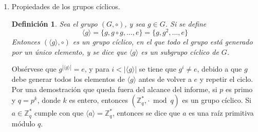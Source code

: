 \documentclass[hidelinks, 12pt]{article}
\newcommand{\Zs}{\mathbb{Z}^*}
\newtheorem*{definition}{Definición}
\begin{document}
\begin{enumerate}
\begin{proof}
        En primer lugar, obsérvese que 
        \[h=f(g)=f(g)\ast e_H=f(g)\ast f(e_i)=f(g\circ e_i),~i=1,\dots,n\]
        Entonces, $g\circ e_i\in f^{-1}(h)$, y como la igualdad planteada encima se cumple para todos los $e_i\in K$, entonces $g\circ e_1,\dots,g\circ e_n\in f^{-1}(h)$, y por lo tanto $g\circ K\subseteq f^{-1}(h)$.

        En segundo lugar, sea $g'\in f^{-1}(h)$. Entonces:
        \begin{align*}
            &g'=e_G\circ g'=(g\circ g^{-1})\circ g'=g\circ(g^{-1}\circ g')&&\big{/}f(~)\\
            f(&g')=f(g\circ(g^{-1}\circ g'))=f(g)\ast f(g^{-1}\circ g') \\
            &h=h\ast f(g^{-1}\circ g')&&\big{/}h^{-1}\ast \\
            &e_H=e_H\ast f(g^{-1}\circ g')=f(g^{-1}\circ g')
        \end{align*}
        Por lo que $g^{-1}\circ g'\in K$, y si se define $c=g^{-1}\circ g'$, se obtiene que $g'=g\circ c$ para un $c\in K$. Esto significa que $g'\in g\circ K$, lo que implica que $f^{-1}(h)\subseteq g\circ K$.

        Debido a que $f^{-1}(h)\subseteq g\circ K$ y $f^{-1}(h)\supseteq g\circ K$, se comprueba que $f^{-1}(h)=g\circ K$, y por lo tanto $|f^{-1}(h)|=|g\circ K|=|K|$. Entonces, se concluye que para todo par $h_1,h_2\in H$, se cumple que
        \[|f^{-1}(h_1)|=|K|=|f^{-1}(h_2)|\]
    \end{proof}

    \newpage
    \item Propiedades de los grupos cíclicos. \\
    \begin{definition}
        Sea el grupo $(G,\circ)$, y sea $g\in G$. Si se define
        \[\langle g\rangle=\{g,g\circ g,\dots,e\}=\{g,g^2,\dots,e\}\]
        Entonces $(\langle g\rangle,\circ)$ es un grupo cíclico, en el que todo el grupo está generado por un único elemento, y se dice que $\langle g\rangle$ es un subgrupo cíclico de $G$.
    \end{definition}

    Obsérvese que $g^{|\langle g\rangle|}=e$, y para $i<|\langle g\rangle|$ se tiene que $g^i\neq e$, debido a que $g$ debe generar todos los elementos de $\langle g\rangle$ antes de volver a $e$ y repetir el ciclo. Por una demostración que queda fuera del alcance del informe, si $p$ es primo y $q=p^k$, donde $k$ es entero, entonces $(\Zs_q,\cdot\bmod q)$ es un grupo cíclico. Si $a\in\Zs_q$ cumple con que $\langle a\rangle=\Zs_q$, entonces se dice que $a$ es una raíz primitiva módulo $q$.


\end{enumerate}
\end{document}
